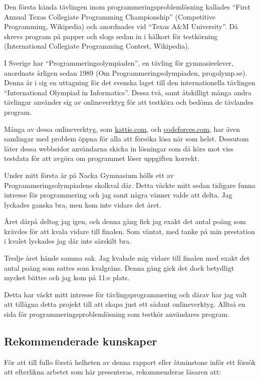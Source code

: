 \documentclass{article}
\begin{document}
Den första kända tävlingen inom programmeringsproblemlösning kallades ``First
Annual Texas Collegiate Programming Championship'' (Competitive Programming,
Wikipedia) och anordnades vid ``Texas A\&M University''. Då skrevs program på
papper och slogs sedan in i hålkort för testkörning (International Collegiate
Programming Contest, Wikipedia).

I Sverige har ``Programmeringsolympiaden'', en tävling för gymnasieelever,
anordnats årligen sedan 1989 (Om Programmeringsolympiaden, progolymp.se). Denna
är i sig en uttagning för det svenska laget till den internationella tävlingen
``International Olympiad in Informatics''.  Dessa två, samt åtskilligt många
andra tävlingar använder sig av onlineverktyg för att testköra och bedöma de
tävlandes program.

Många av dessa onlineverktyg, som \href{https://open.kattis.com}{kattis.com},
och \href{https://codefoces.com}{codeforces.com}, har även samlingar med problem
öppna för alla att försöka lösa när som helst. Dessutom låter dessa webbsidor
användarna skicka in lösningar som då körs mot viss testdata för att avgöra om
programmet löser uppgiften korrekt.

Under mitt första år på Nacka Gymnasium hölls ett av Programmeringsolympiadens
skolkval där. Detta väckte mitt sedan tidigare funna intresse för programmering
och jag samt några vänner valde att delta. Jag lyckades ganska bra, men kom inte
vidare det året.

Året därpå deltog jag igen, och denna gång fick jag exakt det antal poäng
som krävdes för att kvala vidare till finalen. Som väntat, med tanke på min
prestation i kvalet lyckades jag där inte särskilt bra.

Tredje året hände samma sak. Jag kvalade mig vidare till finalen med exakt det
antal poäng som sattes som kvalgräns. Denna gång gick det dock betydligt mycket
bättre och jag kom på 11:e plats.

Detta har väckt mitt intresse för tävlingsprogrammering och därav har jag valt
att tillägna detta projekt till att skapa just ett sådant onlineverktyg. Alltså
en sida för programmeringsproblemlösning som testkör användares program.

\subsection{Rekommenderade kunskaper}

För att till fullo förstå helheten av denna rapport eller åtminstone inför ett
försök att efterlikna arbetet som här presenteras, rekommenderas läsaren att:
\end{document}
